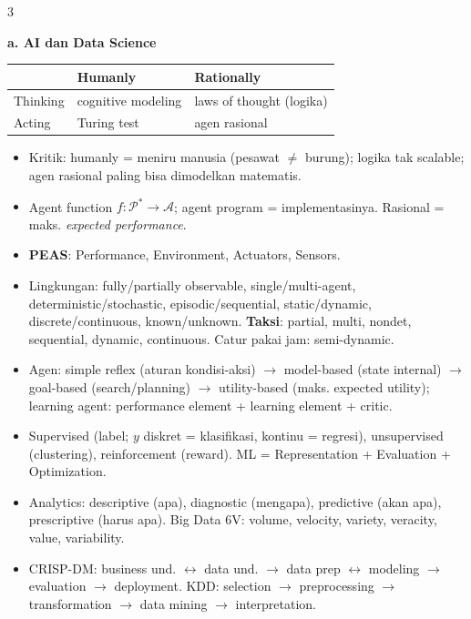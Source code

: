 \documentclass[8pt]{extarticle}
\newcommand{\sect}[1]{\par\vspace{1.5pt}\colorbox{black!12}{\parbox{\dimexpr\columnwidth-2\fboxsep}{\textbf{#1}}}\par\vspace{0.8pt}}
\begin{document}
\begin{multicols*}{3}
\sect{a. AI dan Data Science}
\begin{tabular}{@{}>{\raggedright}p{}|>{\raggedright}p{}|>{\raggedright\arraybackslash}p{}@{}}
 & \textbf{Humanly} & \textbf{Rationally}\\\hline
Thinking & cognitive modeling & laws of thought (logika)\\
Acting & Turing test & agen rasional\\
\end{tabular}
\begin{itemize}
\item Kritik: humanly = meniru manusia (pesawat $\ne$ burung); logika tak scalable; agen rasional paling bisa dimodelkan matematis.
\item Agent function $f:\mathcal P^*\to\mathcal A$; agent program = implementasinya. Rasional = maks. \emph{expected performance}.
\item \textbf{PEAS}: Performance, Environment, Actuators, Sensors.
\item Lingkungan: fully/partially observable, single/multi-agent, deterministic/stochastic, episodic/sequential, static/dynamic, discrete/continuous, known/unknown. \textbf{Taksi}: partial, multi, nondet, sequential, dynamic, continuous. Catur pakai jam: semi-dynamic.
\item Agen: simple reflex (aturan kondisi-aksi) $\to$ model-based (state internal) $\to$ goal-based (search/planning) $\to$ utility-based (maks. expected utility); learning agent: performance element + learning element + critic.
\item Supervised (label; $y$ diskret = klasifikasi, kontinu = regresi), unsupervised (clustering), reinforcement (reward). ML = Representation + Evaluation + Optimization.
\item Analytics: descriptive (apa), diagnostic (mengapa), predictive (akan apa), prescriptive (harus apa). Big Data 6V: volume, velocity, variety, veracity, value, variability.
\item CRISP-DM: business und. $\leftrightarrow$ data und. $\to$ data prep $\leftrightarrow$ modeling $\to$ evaluation $\to$ deployment. KDD: selection $\to$ preprocessing $\to$ transformation $\to$ data mining $\to$ interpretation.
\end{itemize}


\end{multicols*}
\end{document}
